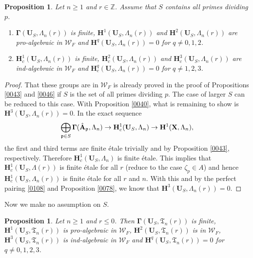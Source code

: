 \documentclass{amsart}
\newtheorem{Prop}[Thm]{Proposition}
\theoremstyle{remark}
\numberwithin{equation}{section}
\newcommand{\Z}{\mathbb{Z}}
\newcommand{\alg}[1]{\mathbf{#1}}
\newcommand{\ideal}[1]{\mathfrak{#1}}
\begin{document}
\begin{Prop} \label{0075}
	Let $n \ge 1$ and $r \in \Z$.
	Assume that $S$ contains all primes dividing $p$.
	\begin{enumerate}
		\item
			$\alg{\Gamma}(\alg{U}_{S}, \Lambda_{n}(r))$ is finite,
			$\alg{H}^{1}(\alg{U}_{S}, \Lambda_{n}(r))$ and
			$\alg{H}^{2}(\alg{U}_{S}, \Lambda_{n}(r))$ are pro-algebraic in $\mathcal{W}_{F}$
			and $\alg{H}^{q}(\alg{U}_{S}, \Lambda_{n}(r)) = 0$ for $q \ne 0, 1, 2$.
		\item
			$\alg{H}^{1}_{c}(\alg{U}_{S}, \Lambda_{n}(r))$ is finite,
			$\alg{H}^{2}_{c}(\alg{U}_{S}, \Lambda_{n}(r))$ and
			$\alg{H}^{3}_{c}(\alg{U}_{S}, \Lambda_{n}(r))$ are ind-algebraic in $\mathcal{W}_{F}$
			and $\alg{H}^{q}_{c}(\alg{U}_{S}, \Lambda_{n}(r)) = 0$ for $q \ne 1, 2, 3$.
	\end{enumerate}
\end{Prop}

\begin{proof}
	That these groups are in $\mathcal{W}_{F}$ is already proved in the proof of
	Propositions \ref{0043} and \ref{0046}
	if $S$ is the set of all primes dividing $p$.
	The case of larger $S$ can be reduced to this case.
	With Proposition \ref{0040},
	what is remaining to show is $\alg{H}^{3}(\alg{U}_{S}, \Lambda_{n}(r)) = 0$.
	In the exact sequence
		\[
				\bigoplus_{\ideal{p} \in S}
					\alg{\Gamma}(\Hat{\alg{A}}_{\ideal{p}}, \Lambda_{n})
			\to
				\alg{H}^{1}_{c}(\alg{U}_{S}, \Lambda_{n})
			\to
				\alg{H}^{1}(\alg{X}, \Lambda_{n}),
		\]
	the first and third terms are finite \'etale
	trivially and by Proposition \ref{0043}, respectively.
	Therefore $\alg{H}^{1}_{c}(\alg{U}_{S}, \Lambda_{n})$ is finite \'etale.
	This implies that $\alg{H}^{1}_{c}(\alg{U}_{S}, \Lambda(r))$ is finite \'etale for all $r$
	(reduce to the case $\zeta_{p} \in A$)
	and hence $\alg{H}^{1}_{c}(\alg{U}_{S}, \Lambda_{n}(r))$ is finite \'etale for all $r$ and $n$.
	With this and by the perfect pairing \eqref{0108} and Proposition \ref{0078},
	we know that $\alg{H}^{3}(\alg{U}_{S}, \Lambda_{n}(r)) = 0$.
\end{proof}

Now we make no assumption on $S$.

\begin{Prop} \label{0050}
	Let $n \ge 1$ and $r \le 0$.
	Then $\alg{\Gamma}(\alg{U}_{S}, \mathfrak{T}_{n}(r))$ is finite,
	$\alg{H}^{1}(\alg{U}_{S}, \mathfrak{T}_{n}(r))$ is pro-algebraic in $\mathcal{W}_{F}$,
	$\alg{H}^{2}(\alg{U}_{S}, \mathfrak{T}_{n}(r))$ is in $\mathcal{W}_{F}$,
	$\alg{H}^{3}(\alg{U}_{S}, \mathfrak{T}_{n}(r))$ is ind-algebraic in $\mathcal{W}_{F}$
	and $\alg{H}^{q}(\alg{U}_{S}, \mathfrak{T}_{n}(r)) = 0$ for $q \ne 0, 1, 2, 3$.
\end{Prop}
\end{document}
